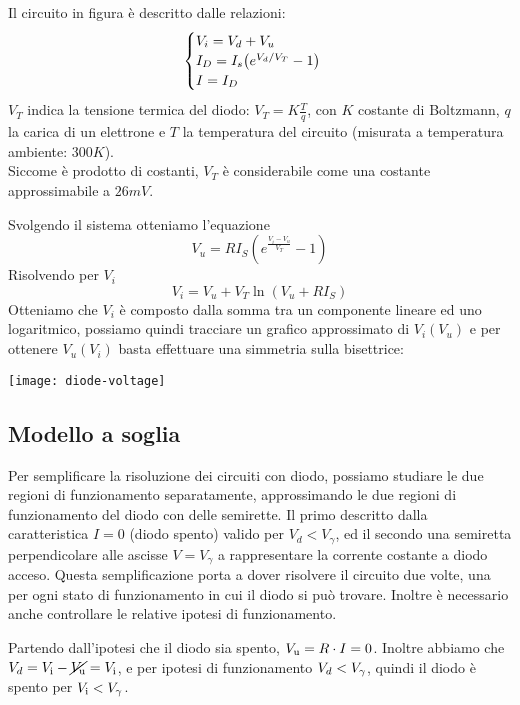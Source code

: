 \documentclass[../elettronica]{subfiles}
\begin{document}
Il circuito in figura è descritto dalle relazioni:
\[
    \begin{cases}
        V_i = V_d + V_u
        \\
        I_D = I_s \big(e^{V_d/V_T} -1\big)
        \\
        I = I_D
    \end{cases}
\]
$V_T$ indica la tensione termica del diodo: $V_T = K \frac{T}{q}$, con $K$ costante di Boltzmann, $q$ la carica di un elettrone e
$T$ la temperatura del circuito (misurata a temperatura ambiente: $300K$).
\\
Siccome è prodotto di costanti, $V_T$ è considerabile come una costante approssimabile a $26mV$.

Svolgendo il sistema otteniamo l'equazione
\[
    V_u = R I_S (e^{\frac{V_i - V_u}{V_T}} -1)
\]
Risolvendo per $V_i$
\[
    V_i = V_u + V_T \ln(V_u + R I_S)
\]
Otteniamo che $V_i$ è composto dalla somma tra un componente lineare ed uno logaritmico, possiamo quindi tracciare un grafico approssimato di $V_i(V_u)$ e per ottenere $V_u(V_i)$ basta effettuare una simmetria sulla bisettrice:

\begin{center}
    \texttt{[image: diode-voltage]}
\end{center}

\subsection{Modello a soglia}
Per semplificare la risoluzione dei circuiti con diodo, possiamo studiare le due regioni di funzionamento separatamente,
approssimando le due regioni di funzionamento del diodo con delle semirette.
Il primo descritto dalla caratteristica $I = 0$ (diodo spento) valido per $V_d < V_\gamma$, ed il secondo una semiretta
perpendicolare alle ascisse $V = V_\gamma$ a rappresentare la corrente costante a diodo acceso.
Questa semplificazione porta a dover risolvere il circuito due volte, una per ogni stato di funzionamento in cui
il diodo si può trovare. Inoltre è necessario anche controllare le relative ipotesi di funzionamento.

Partendo dall'ipotesi che il diodo sia spento, $V_{\text{u}} = R \cdot I = 0$.
Inoltre abbiamo che $V_d = V_{\text{i}} - \cancel{V_{\text{u}}} = V_{\text{i}}$, e per ipotesi di funzionamento $V_d < V_\gamma$, quindi il diodo
è spento per $V_{\text{i}} < V_\gamma$.
\end{document}
